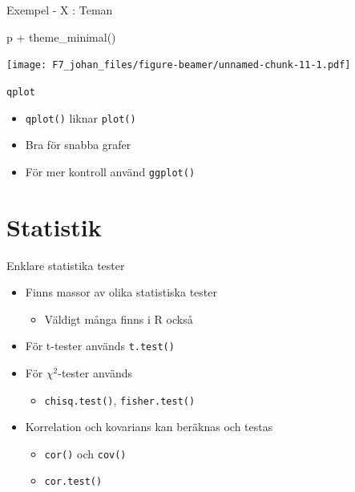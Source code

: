 \documentclass[
  11pt,
  ignorenonframetext,
  handout]{beamer}
\newenvironment{Shaded}{\begin{snugshade}}{\end{snugshade}}
\newcommand{\FunctionTok}[1]{\textcolor[rgb]{0.00,0.00,0.00}{#1}}
\newcommand{\NormalTok}[1]{#1}
\newcommand{\SpecialCharTok}[1]{\textcolor[rgb]{0.00,0.00,0.00}{#1}}
\providecommand{\tightlist}{%
  \setlength{\itemsep}{0pt}\setlength{\parskip}{0pt}}
\begin{document}
\begin{frame}[fragile]{Exempel - X : Teman}
\protect\hypertarget{exempel---x-teman}{}
\begin{Shaded}
\begin{Highlighting}[]
\NormalTok{p }\SpecialCharTok{+} \FunctionTok{theme\_minimal}\NormalTok{()}
\end{Highlighting}
\end{Shaded}

\texttt{[image: F7\_johan\_files/figure-beamer/unnamed-chunk-11-1.pdf]}
\end{frame}

\begin{frame}{\texttt{qplot}}
\protect\hypertarget{section}{}
\begin{itemize}
\tightlist
\item
  \texttt{qplot()} liknar \texttt{plot()}
\item
  Bra för snabba grafer
\item
  För mer kontroll använd \texttt{ggplot()}
\end{itemize}
\end{frame}

\hypertarget{statistik}{%
\section{Statistik}\label{statistik}}

\begin{frame}{Enklare statistika tester}
\protect\hypertarget{enklare-statistika-tester}{}
\begin{itemize}
\tightlist
\item
  Finns massor av olika statistiska tester

  \begin{itemize}
  \tightlist
  \item
    Väldigt många finns i R också
  \end{itemize}
\item
  För t-tester används \texttt{t.test()}
\item
  För \(\chi^2\)-tester används

  \begin{itemize}
  \tightlist
  \item
    \texttt{chisq.test()}, \texttt{fisher.test()}
  \end{itemize}
\item
  Korrelation och kovarians kan beräknas och testas

  \begin{itemize}
  \tightlist
  \item
    \texttt{cor()} och \texttt{cov()}
  \item
    \texttt{cor.test()}
  \end{itemize}
\end{itemize}
\end{frame}
\end{document}
